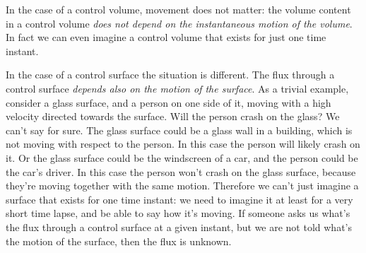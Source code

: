 \documentclass[a4paper,12pt,%
onecolumn,oneside,%
british%
]{memoir}
\renewcommand*{\|}[1][]{\nonscript\:#1\vert\nonscript\:\mathopen{}}
\begin{document}
In the case of a control volume, movement does not matter: the volume content in a control volume \emph{does not depend on the instantaneous motion of the volume}. In fact we can even imagine a control volume that exists for just one time instant.

% 
%
In the case of a control surface the situation is different. The flux through a control surface \emph{depends also on the motion of the surface}. As a trivial example, consider a glass surface, and a person on one side of it, moving with a high velocity directed towards the surface. Will the person crash on the glass? We can't say for sure. The glass surface could be a glass wall in a building, which is not moving with respect to the person. In this case the person will likely crash on it. Or the glass surface could be the windscreen of a car, and the person could be the car's driver. In this case the person won't crash on the glass surface, because they're moving together with the same motion. Therefore we can't just imagine a surface that exists for one time instant: we need to imagine it at least for a very short time lapse, and be able to say how it's moving. If someone asks us what's the flux through a control surface at a given instant, but we are not told what's the motion of the surface, then the flux is unknown.
\end{document}
